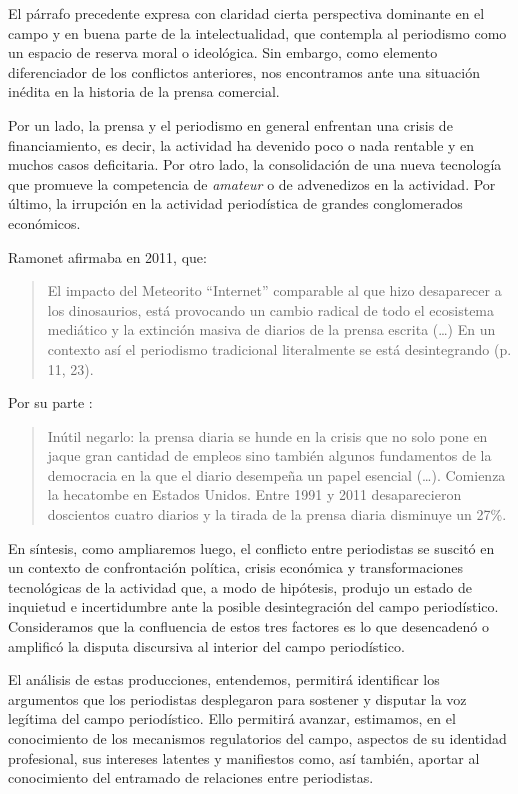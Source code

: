 El párrafo precedente expresa con claridad cierta perspectiva dominante en el campo y en buena parte de la intelectualidad, que contempla al periodismo como un espacio de reserva moral o ideológica. Sin embargo, como elemento diferenciador de los conflictos anteriores, nos encontramos ante una situación inédita en la historia de la prensa comercial.

Por un lado, la prensa y el periodismo en general enfrentan una crisis de financiamiento, es decir, la actividad ha devenido poco o nada rentable y en muchos casos deficitaria. Por otro lado, la consolidación de una nueva tecnología que promueve la competencia de \emph{amateur} o de advenedizos en la actividad. Por último, la irrupción en la actividad periodística de grandes conglomerados económicos.

Ramonet afirmaba en 2011, que:

\begin{quote}
	El impacto del Meteorito \enquote{Internet} comparable al que hizo desaparecer a los dinosaurios, está provocando un cambio radical de todo el ecosistema mediático y la extinción masiva de diarios de la prensa escrita (\dots) En un contexto así el periodismo tradicional literalmente se está desintegrando (p. 11, 23).
\end{quote}


Por su parte \textcite[34-35]{@6971-BENHAMOU2015}:

\begin{quote}
	Inútil negarlo: la prensa diaria se hunde en la crisis que no solo pone en jaque gran cantidad de empleos sino también algunos fundamentos de la democracia en la que el diario desempeña un papel esencial (\dots). Comienza la hecatombe en Estados Unidos. Entre 1991 y 2011 desaparecieron doscientos cuatro diarios y la tirada de la prensa diaria disminuye un 27\%.
\end{quote}


En síntesis, como ampliaremos luego, el conflicto entre periodistas se suscitó en un contexto de confrontación política, crisis económica y transformaciones tecnológicas de la actividad que, a modo de hipótesis, produjo un estado de inquietud e incertidumbre ante la posible desintegración del campo periodístico. Consideramos que la confluencia de estos tres factores es lo que desencadenó o amplificó la disputa discursiva al interior del campo periodístico.

El análisis de estas producciones, entendemos, permitirá identificar los argumentos que los periodistas desplegaron para sostener y disputar la voz legítima del campo periodístico. Ello permitirá avanzar, estimamos, en el conocimiento de los mecanismos regulatorios del campo, aspectos de su identidad profesional, sus intereses latentes y manifiestos como, así también, aportar al conocimiento del entramado de relaciones entre periodistas.

